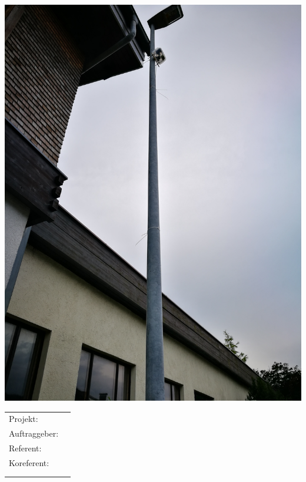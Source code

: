 \begin{titlepage}
\maketitle
\thispagestyle{empty} %

\begin{center}
\includegraphics[height=0.55\textheight]{FaC_Titelbild.jpg} %
\end{center}

\begin{center}
  \begin{tabular}[t]{ll}
  \\
	Projekt:       & \quad \projektName \\[1.2ex]
	Auftraggeber:  & \quad \auftraggeber\\[1.2ex]
	Referent: 	   & \quad \RefName\\ [1.2ex]
	Koreferent:    & \quad \coRefName\\\\\\ [1.2ex]
  \end{tabular}
\begin{verbatim}

\end{verbatim}

\end{center}
\end{titlepage}

